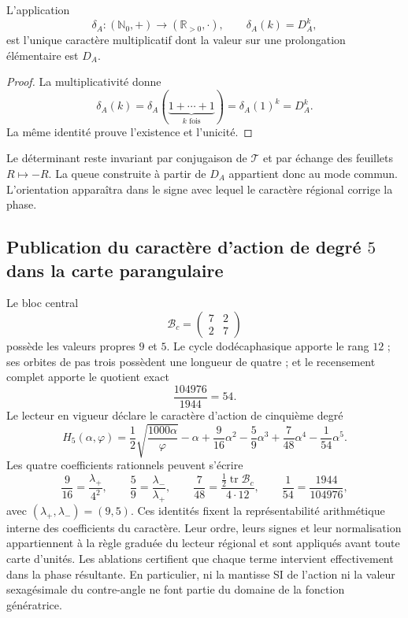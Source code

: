 \begin{proposition}
\label{p3-20260826:prop:caracter-determinante}
L'application
\[
\delta_A:(\mathbb N_0,+)\longrightarrow(\mathbb R_{>0},\cdot),
\qquad
\delta_A(k)=D_A^k,
\]
est l'unique caractère multiplicatif dont la valeur sur une prolongation
élémentaire est \(D_A\).
\end{proposition}

\begin{proof}
La multiplicativité donne
\[
\delta_A(k)
=\delta_A(\underbrace{1+\cdots+1}_{k\text{ fois}})
=\delta_A(1)^k=D_A^k.
\]
La même identité prouve l'existence et l'unicité.
\end{proof}

Le déterminant reste invariant par conjugaison de \(\mathcal T\) et par échange des feuillets \(R\mapsto-R\). La queue construite à partir de \(D_A\) appartient donc au mode commun. L'orientation apparaîtra dans le signe avec lequel le caractère régional corrige la phase.

\subsection{Publication du caractère d'action de degré \texorpdfstring{\(5\)}{5} dans la carte parangulaire}
\label{sec:s102:c38:3:5}


Le bloc central
\[
\mathcal B_c=\begin{pmatrix}7&2\\2&7\end{pmatrix}
\]
possède les valeurs propres \(9\) et \(5\). Le cycle dodécaphasique apporte le rang
\(12\) ; ses orbites de pas trois possèdent une longueur de quatre ; et le recensement complet
apporte le quotient exact
\[
\frac{104976}{1944}=54.
\]
Le lecteur en vigueur déclare le caractère d'action de cinquième degré
\[
\boxed{
H_5(\alpha,\varphi)
=\frac12\sqrt{\frac{1000\alpha}{\varphi}}-\alpha
+\frac9{16}\alpha^2-\frac59\alpha^3
+\frac7{48}\alpha^4-\frac1{54}\alpha^5.}
\]
Les quatre coefficients rationnels peuvent s'écrire
\[
\frac9{16}=\frac{\lambda_+}{4^2},
\qquad
\frac59=\frac{\lambda_-}{\lambda_+},
\qquad
\frac7{48}=\frac{\tfrac12\operatorname{tr}\mathcal B_c}{4\cdot12},
\qquad
\frac1{54}=\frac{1944}{104976},
\]
avec \((\lambda_+,\lambda_-)=(9,5)\). Ces identités fixent la
représentabilité arithmétique interne des coefficients du caractère. Leur
ordre, leurs signes et leur normalisation appartiennent à la règle graduée du lecteur
régional et sont appliqués avant toute carte d'unités. Les ablations
certifient que chaque terme intervient effectivement dans la phase résultante.
En particulier, ni la mantisse SI de l'action ni la valeur sexagésimale du
contre-angle ne font partie du domaine de la fonction génératrice.

